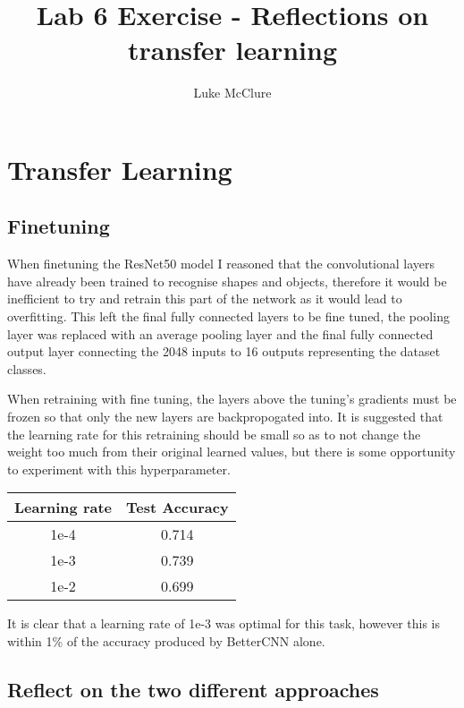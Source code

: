\documentclass[sigconf]{acmart}
\begin{document}
\title{Lab 6 Exercise - Reflections on transfer learning}
\author{Luke McClure}

\maketitle
\pagestyle{myheadings}

\section{Transfer Learning}

\subsection{Finetuning}
When finetuning the ResNet50 model I reasoned that the convolutional layers have already been trained to recognise shapes and objects, therefore it would be inefficient to try and retrain this part of the network as it would lead to overfitting. 
This left the final fully connected layers to be fine tuned, the pooling layer was replaced with an average pooling layer and the final fully connected output layer connecting the 2048 inputs to 16 outputs representing the dataset classes.

When retraining with fine tuning, the layers above the tuning's gradients must be frozen so that only the new layers are backpropogated into. 
It is suggested that the learning rate for this retraining should be small so as to not change the weight too much from their original learned values, 
but there is some opportunity to experiment with this hyperparameter.
\begin{center}
    \begin{tabular}{ |c c| } 
     \hline
     Learning rate & Test Accuracy \\ 
     \hline
     1e-4 & 0.714 \\ 
     1e-3 & 0.739 \\ 
     1e-2 & 0.699 \\
     \hline
    \end{tabular}
\end{center}

It is clear that a learning rate of 1e-3 was optimal for this task, however this is within 1\% of the accuracy produced by BetterCNN alone. 

\subsection{Reflect on the two different approaches}
\end{document}

